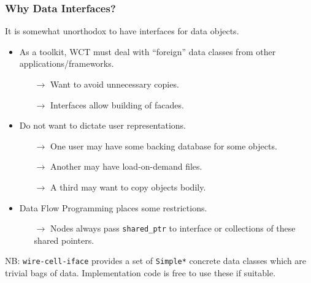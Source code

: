 \documentclass[xcolor=dvipsnames]{beamer}
\begin{document}
\begin{frame}
  \frametitle{Why Data Interfaces?}

  It is somewhat unorthodox to have interfaces for data objects.

  \begin{itemize}
  \item As a toolkit, WCT must deal with ``foreign'' data classes from
    other applications/frameworks.
    \begin{itemize}\footnotesize
    \item[$\to$] Want to avoid unnecessary copies.
    \item[$\to$] Interfaces allow building of facades.
    \end{itemize}
  \item Do not want to dictate user representations.
    \begin{itemize}\footnotesize
    \item[$\to$] One user may have some backing database for some objects.
    \item[$\to$] Another may have load-on-demand files.
    \item[$\to$] A third may want to copy objects bodily.
    \end{itemize}
  \item Data Flow Programming places some restrictions.
    \begin{itemize}\footnotesize
    \item[$\to$] Nodes always pass \texttt{shared\_ptr} to interface
      or collections of these shared pointers.
    \end{itemize}
  \end{itemize}

  \vfill \footnotesize NB: \texttt{wire-cell-iface} provides a set of
  \texttt{Simple*} concrete data classes which are trivial bags of
  data.  Implementation code is free to use these if suitable.
  
  
\end{frame}
\end{document}
